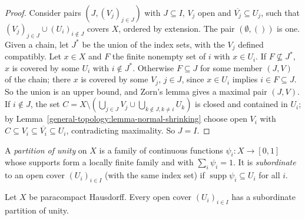 \begin{proof}
Consider pairs $(J, (V_j)_{j \in J})$ with $J \subseteq I$, $V_j$ open and $\overline{V_j} \subseteq U_j$, such that $(V_j)_{j \in J} \cup (U_i)_{i \notin J}$ covers
$X$, ordered by extension. The pair $(\emptyset, ())$ is one. Given a chain, let $J^*$ be the union of the index sets, with the $V_j$ defined compatibly. Let
$x \in X$ and $F$ the finite nonempty set of $i$ with $x \in U_i$. If $F \not\subseteq J^*$, $x$ is covered by some $U_i$ with $i \notin J^*$. Otherwise
$F \subseteq J$ for some member $(J, V)$ of the chain; there $x$ is covered by some $V_j$, $j \in J$, since $x \in U_i$ implies $i \in F \subseteq J$. So the union
is an upper bound, and Zorn's lemma gives a maximal pair $(J, V)$. If $i \notin J$, the set
$C = X \setminus (\bigcup_{j \in J} V_j \cup \bigcup_{k \notin J, k \neq i} U_k)$ is closed and contained in $U_i$; by
Lemma~\ref{general-topology:lemma-normal-shrinking} choose open $V_i$ with $C \subseteq V_i \subseteq \overline{V_i} \subseteq U_i$, contradicting maximality. So
$J = I$.
\end{proof}

\begin{definition}\label{general-topology:definition-partition-of-unity}
A \emph{partition of unity} on $X$ is a family of continuous functions $\psi_i \colon X \to [0, 1]$ whose supports form a locally finite family and with
$\sum_i \psi_i = 1$. It is \emph{subordinate} to an open cover $(U_i)_{i \in I}$ (with the same index set) if $\operatorname{supp} \psi_i \subseteq U_i$ for all
$i$.
\end{definition}

\begin{theorem}\label{general-topology:theorem-partitions-of-unity}
Let $X$ be paracompact Hausdorff. Every open cover $(U_i)_{i \in I}$ has a subordinate partition of unity.
\end{theorem}

